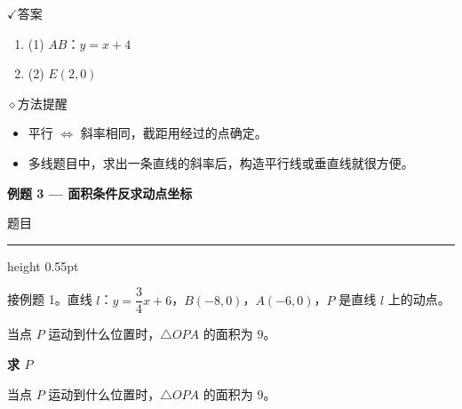 \documentclass{exam-zh}
\newcommand{\eduSectionTitle}[1]{%
  \needspace{5\baselineskip}%
  \vspace{2mm}
  {\color{edu-blue}\bfseries\large #1}\par
  \vspace{3mm}
}
\newenvironment{eduSubQuestionItem}[1]{%
  \needspace{4\baselineskip}%
  \vspace{2mm}
  \par\noindent
  \hangindent=8mm\hangafter=1
  {\color{edu-blue}\bfseries #1}\enspace
  \begingroup
  \color{edu-ink}
}{%
  \endgroup
  \par
  \vspace{3mm}
}
\newcommand{\eduIconCheck}{\(\checkmark\)}
\newcommand{\eduIconPin}{\(\diamond\)}
\newenvironment{eduProblemBlock}[1][题目]{%
  \needspace{8\baselineskip}
  {\small\color{edu-muted}#1}\par
  \vspace{1.5mm}
  {\color{edu-blue}\hrule height 0.55pt}
  \vspace{4.5mm}
  \begingroup
  \color{edu-ink}
  \large
  \setlength{\parskip}{2.2mm}
  \linespread{1.20}\selectfont
}{%
  \par
  \endgroup
  \vspace{6mm}
}
\newenvironment{eduBulletList}{%
  \begin{itemize}[
    label=\textbullet,
    leftmargin=5mm,
    itemsep=1.2mm,
    topsep=0pt,
    parsep=0pt
  ]
}{%
  \end{itemize}
}
\newenvironment{eduBottomGrid}{%
  \vspace{1mm}
  \par\noindent
}{%
  \par\vspace{1mm}
}
\newenvironment{eduSummaryLeft}{%
  \begin{minipage}[t]{0.30\linewidth}
}{%
  \end{minipage}
}
\newcommand{\eduSummaryDivider}{%
  \hspace{4mm}{\color{edu-line}\vrule width 0.35pt}\hspace{7mm}%
}
\newenvironment{eduSummaryRight}{%
  \begin{minipage}[t]{0.58\linewidth}
}{%
  \end{minipage}
}
\newenvironment{eduPlainList}{%
  \begin{enumerate}[
    label=(\arabic*),
    leftmargin=7mm,
    itemsep=1.2mm,
    topsep=0pt,
    parsep=0pt
  ]
}{%
  \end{enumerate}
}
\begin{document}
\begin{eduBottomGrid}
  \begin{eduSummaryLeft}
    \begin{eduSummaryBlock}{\eduIconCheck}{答案}
    \begin{eduPlainList}
      \item (1) $AB$：$y = x + 4$      \item (2) $E(2, 0)$    \end{eduPlainList}
    \end{eduSummaryBlock}
  \end{eduSummaryLeft}
  \eduSummaryDivider
  \begin{eduSummaryRight}
    \begin{eduSummaryBlock}{\eduIconPin}{方法提醒}
    \begin{eduBulletList}
      \item 平行 $\Leftrightarrow$ 斜率相同，截距用经过的点确定。      \item 多线题目中，求出一条直线的斜率后，构造平行线或垂直线就很方便。    \end{eduBulletList}
    \end{eduSummaryBlock}
  \end{eduSummaryRight}
\end{eduBottomGrid}



\eduSectionTitle{例题 3 — 面积条件反求动点坐标}

\begin{eduProblemBlock}[题目]
接例题 1。直线 $l$：$y=\dfrac{3}{4}x+6$，$B(-8,0)$，$A(-6,0)$，$P$ 是直线 $l$ 上的动点。

当点 $P$ 运动到什么位置时，$\triangle OPA$ 的面积为 $9$。
\end{eduProblemBlock}









\begin{eduSubQuestionItem}{求 $P$}
当点 $P$ 运动到什么位置时，$\triangle OPA$ 的面积为 $9$。\end{eduSubQuestionItem}
\end{document}
